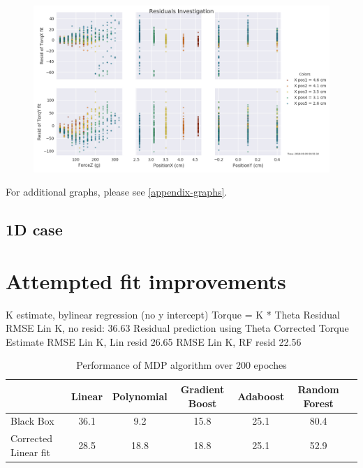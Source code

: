 \documentclass[preprint,12pt,3p]{elsarticle}
\begin{document}

\begin{figure}[H]
\centering
\includegraphics[width=1\textwidth]{images/round1/resids_Force_coloredX.png}
\end{figure}


For additional graphs, please see \ref{appendix-graphs}.

\subsection{1D case}


\section{Attempted fit improvements}

K estimate, bylinear regression (no y intercept)
Torque = K * Theta
Residual
RMSE Lin K, no resid: 36.63
Residual prediction using Theta
Corrected Torque Estimate
RMSE Lin K, Lin resid 26.65
RMSE Lin K, RF resid 22.56

\begin{table}[H]
    \centering
    \caption{Performance of MDP algorithm over 200 epoches}\label{tab:MDP_calibration}
    \begin{tabular}{l|c|c|c|c|c|c}
         \hline \hline
         &  Linear & Polynomial & Gradient Boost & Adaboost & Random Forest\\
         \hline 
         Black Box          & 36.1 & 9.2 & 15.8 & 25.1 & 80.4 \\ 
         Corrected Linear fit & 28.5 & 18.8 & 18.8 & 25.1 & 52.9 \\
    \hline
    \end{tabular}
\end{table}
\end{document}
